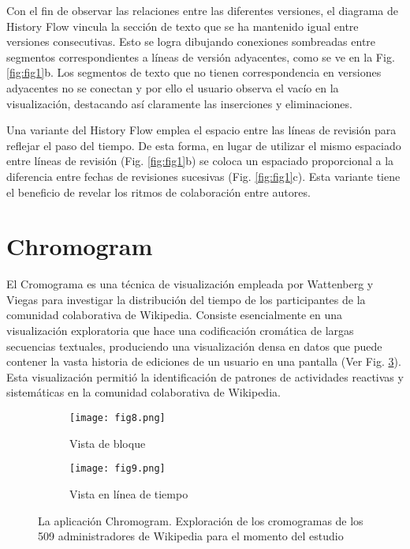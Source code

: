 Con el fin de observar las relaciones entre las diferentes versiones, el diagrama de History Flow vincula la sección de texto que se ha mantenido igual entre versiones consecutivas. Esto se logra dibujando conexiones sombreadas entre segmentos correspondientes a líneas de versión adyacentes, como se ve en la Fig. \ref{fig:fig1}b. Los segmentos de texto que no tienen correspondencia en versiones adyacentes no se conectan y por ello el usuario observa el vacío en la visualización, destacando así claramente las inserciones y eliminaciones.

Una variante del History Flow emplea el espacio entre las líneas de revisión para reflejar el paso del tiempo. De esta forma, en lugar de utilizar el mismo espaciado entre líneas de revisión (Fig. \ref{fig:fig1}b) se coloca un espaciado proporcional a la diferencia entre fechas de revisiones sucesivas (Fig. \ref{fig:fig1}c). Esta variante tiene el beneficio de revelar los ritmos de colaboración entre autores.

\section{Chromogram}
El Cromograma es una técnica de visualización empleada por Wattenberg y Viegas \cite{Wat07} para investigar la distribución del tiempo de los participantes de la comunidad colaborativa de Wikipedia. Consiste esencialmente en una visualización exploratoria que hace una codificación cromática de largas secuencias textuales, produciendo una visualización densa en datos que puede contener la vasta historia de ediciones de un usuario en una pantalla (Ver Fig. \ref{fig:fig8-9}). Esta visualización permitió la identificación de patrones de actividades reactivas y sistemáticas en la comunidad colaborativa de Wikipedia.

\begin{figure}[htp]
  \begin{subfigure}[b]{0.5\textwidth}
    \centering
    \texttt{[image: fig8.png]}
    \caption[]{Vista de bloque\cite[Fig. 3]{Wat07}}
    \label{fig:fig8}
  \end{subfigure}
  \hfill
  \begin{subfigure}[b]{0.45\textwidth}
    \centering
    \texttt{[image: fig9.png]}
    \caption[]{Vista en línea de tiempo\cite[Fig. 4]{Wat07}}
    \label{fig:fig9}
  \end{subfigure}
  \caption[La aplicacieon Chromogram]{La aplicación Chromogram. Exploración de los cromogramas de los 509 administradores de Wikipedia para el momento del estudio}
  \label{fig:fig8-9}
\end{figure}

